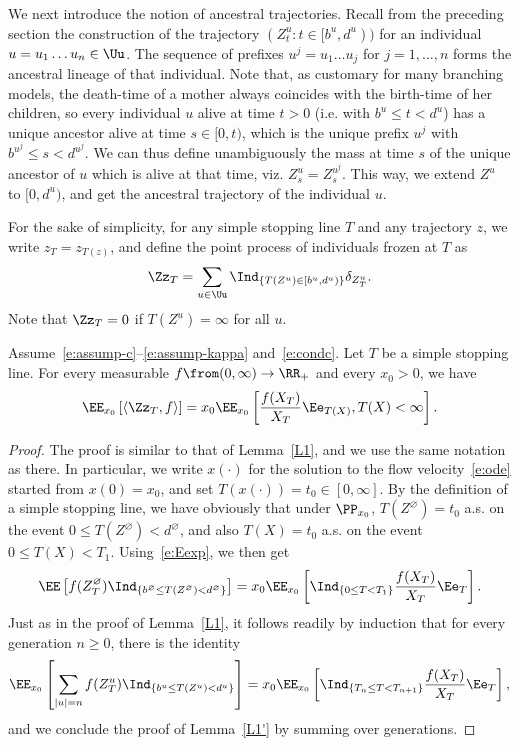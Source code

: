 We next introduce the notion of ancestral trajectories. Recall from the preceding section the construction of the trajectory $(Z^u_t: t\in[b^u, d^u))$ for an individual\linebreak$u=u_1\ldots u_n\in\Uu$. The sequence of prefixes $u^j=u_1 \ldots u_j$ for $j=1, \ldots, n$ forms the ancestral lineage of that individual. Note that, as customary for many branching models, the death-time of a mother always coincides with the birth-time of her children, so every individual $u$ alive at time $t>0$ (i.e. with $b^u\leq t < d^u$) has a unique ancestor alive at time $s\in[0,t)$, which is the unique prefix $u^j$ with $b^{u^j}\leq s < d^{u^j}$. We can thus define unambiguously the mass at time $s$ of the unique ancestor of $u$ which is alive at that time, viz. $Z^u_s=Z^{u^j}_s$. This way, we extend $Z^u$ to $[0,d^u)$, and get the ancestral trajectory of the individual $u$.


For the sake of simplicity, for any simple stopping line $T$ and any trajectory $z$, we write $z_T=z_{T(z)}$, and define the point process of individuals frozen at $T$ as
\[
\Zz_T = \sum_{u\in\Uu} \Ind_{\{T(Z^u)\in[b^u, d^u)\}} \delta_{Z^u_T}.
\]
Note that $\Zz_T = 0$ if $T(Z^u) = \infty$ for all $u$.

\begin{lemm}\label{L1'}
Assume~\eqref{e:assump-c}--\eqref{e:assump-kappa} and~\eqref{e:condc}. Let $T$ be a simple stopping line. For every measurable $f\from (0,\infty)\to \RR_+$ and every $x_0>0$, we have
\[
\EE_{x_0} \left[\langle \Zz_T, f\rangle \right] = x_0\EE_{x_0}\left[\frac{f(X_T)}{X_T}\Ee_{T(X)}, T(X)<\infty \right].
\]
\end{lemm}

\begin{proof}
The proof is similar to that of Lemma~\ref{L1}, and we use the same notation as there.
In particular, we write $x(\cdot)$ for the solution to the flow velocity~\eqref{e:ode} started from $x(0)=x_0$, and set $T(x(\cdot))=t_0\in[0,\infty]$. By the definition of a simple stopping line, we have obviously that under $\PP_{x_0}$, $T(Z^{\varnothing}) = t_0$ a.s. on the event $0\leq T(Z^{\varnothing}) < d^{\varnothing}$, and also $T(X)=t_0$ a.s. on the event $0\leq T(X) < T_1$. Using~\eqref{e:Eexp}, we then get
\[
\EE \left[f(Z^{\varnothing}_T) \Ind_{\{b^{\varnothing} \leq T(Z^{\varnothing}) < d^{\varnothing}\}} \right] =x_0\EE_{x_0}\left[\Ind_{\{0 \leq T < T_{1}\}}\frac{f(X_T)}{X_T}\Ee_T \right].
\]
Just as in the proof of Lemma~\ref{L1}, it follows readily by induction that for every generation $n\geq 0$, there is the identity
\[
\EE_{x_0} \left[\sum_{|u|=n} f(Z^u_T) \Ind_{\{b^u \leq T(Z^u) < d^u\}} \right] = x_0\EE_{x_0}\left[\Ind_{\{T_n \leq T < T_{n+1}\}}\frac{f(X_T)}{X_T}\Ee_T \right],
\]
and we conclude the proof of Lemma~\ref{L1'} by summing over generations.
\end{proof}


